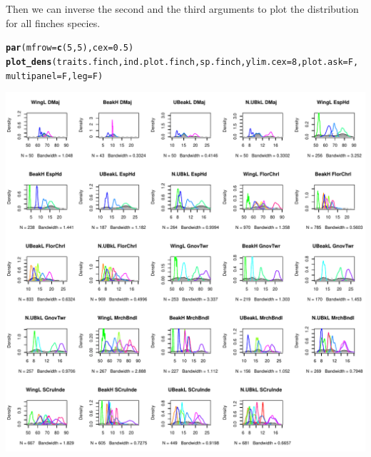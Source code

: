 \documentclass[12pt]{article}\usepackage[]{graphicx}\usepackage[]{color}
\makeatletter
\def\maxwidth{ %
  \ifdim\Gin@nat@width>\linewidth
    \linewidth
  \else
    \Gin@nat@width
  \fi
}
\newcommand{\hlnum}[1]{\textcolor[rgb]{0.686,0.059,0.569}{#1}}%
\newcommand{\hlstd}[1]{\textcolor[rgb]{0.345,0.345,0.345}{#1}}%
\newcommand{\hlkwc}[1]{\textcolor[rgb]{0.333,0.667,0.333}{#1}}%
\newcommand{\hlkwd}[1]{\textcolor[rgb]{0.737,0.353,0.396}{\textbf{#1}}}%
\newenvironment{kframe}{%
 \def\at@end@of@kframe{}%
 \ifinner\ifhmode%
  \def\at@end@of@kframe{\end{minipage}}%
  \begin{minipage}{\columnwidth}%
 \fi\fi%
 \def\FrameCommand##1{\hskip\@totalleftmargin \hskip-\fboxsep
 \colorbox{shadecolor}{##1}\hskip-\fboxsep
     \hskip-\linewidth \hskip-\@totalleftmargin \hskip\columnwidth}%
 \MakeFramed {\advance\hsize-\width
   \@totalleftmargin\z@ \linewidth\hsize
   \@setminipage}}%
 {\par\unskip\endMakeFramed%
 \at@end@of@kframe}
\newenvironment{knitrout}{}{} %
\makeatother
\begin{document}
\newpage

Then we can inverse the second and the third arguments to plot the distribution for all finches species. 
\begin{knitrout}
\color{fgcolor}\begin{kframe}
\begin{alltt}
\hlkwd{par}\hlstd{(}\hlkwc{mfrow} \hlstd{=} \hlkwd{c}\hlstd{(}\hlnum{5}\hlstd{,} \hlnum{5}\hlstd{),} \hlkwc{cex} \hlstd{=} \hlnum{0.5}\hlstd{)}
\hlkwd{plot_dens}\hlstd{(traits.finch, ind.plot.finch, sp.finch,} \hlkwc{ylim.cex} \hlstd{=} \hlnum{8}\hlstd{,} \hlkwc{plot.ask} \hlstd{= F,}
    \hlkwc{multipanel} \hlstd{= F,} \hlkwc{leg} \hlstd{= F)}
\end{alltt}
\end{kframe}
\includegraphics[width=\maxwidth]{figure/unnamed-chunk-5} 

\end{knitrout}
\end{document}
